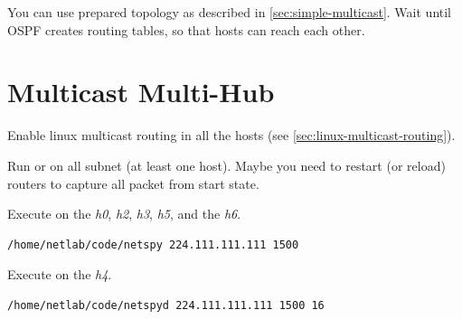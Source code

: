 \documentclass{../UTNetLab}
\begin{document}
You can use prepared topology as described in \autoref{sec:simple-multicast}.
Wait until OSPF creates routing tables, so that hosts can reach each other.



\section{Multicast Multi-Hub}\label{sec:multi-hub}

Enable linux multicast routing in all the hosts (see \autoref{sec:linux-multicast-routing}).

Run  or  on all subnet (at least one host).
Maybe you need to restart (or reload) routers to capture all packet from start state.

Execute  on the \textit{h0}, \textit{h2}, \textit{h3}, \textit{h5}, and the \textit{h6}.

\begin{lstlisting}
/home/netlab/code/netspy 224.111.111.111 1500
\end{lstlisting}

Execute  on the \textit{h4}.

\begin{lstlisting}
/home/netlab/code/netspyd 224.111.111.111 1500 16
\end{lstlisting}
\end{document}
